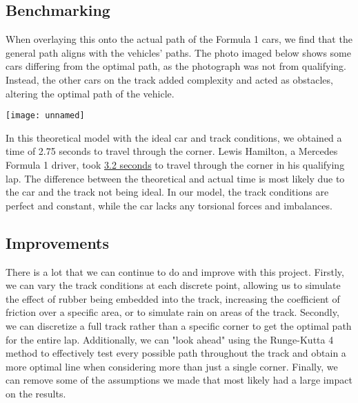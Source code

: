 \documentclass{article}
\begin{document}
\subsection{Benchmarking}
When overlaying this onto the actual path of the Formula 1 cars, we find that the general path aligns with the vehicles' paths. The photo imaged below shows some cars differing from the optimal path, as the photograph was not from qualifying. Instead, the other cars on the track added complexity and acted as obstacles, altering the optimal path of the vehicle.
\begin{center} \texttt{[image: unnamed]} \end{center}
\break \break
In this theoretical model with the ideal car and track conditions, we obtained a time of 2.75 seconds to travel through the corner. Lewis Hamilton, a Mercedes Formula 1 driver, took \href{https://www.youtube.com/watch?v=ugJ-rYS-9JU}{3.2 seconds} to travel through the corner in his qualifying lap. The difference between the theoretical and actual time is most likely due to the car and the track not being ideal. In our model, the track conditions are perfect and constant, while the car lacks any torsional forces and imbalances.

\subsection{Improvements}
There is a lot that we can continue to do and improve with this project. Firstly, we can vary the track conditions at each discrete point, allowing us to simulate the effect of rubber being embedded into the track, increasing the coefficient of friction over a specific area, or to simulate rain on areas of the track. Secondly, we can discretize a full track rather than a specific corner to get the optimal path for the entire lap. Additionally, we can "look ahead" using the Runge-Kutta 4 method to effectively test every possible path throughout the track and obtain a more optimal line when considering more than just a single corner. Finally, we can remove some of the assumptions we made that most likely had a large impact on the results.
\end{document}
